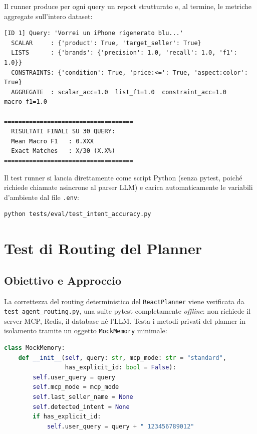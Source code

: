 Il runner produce per ogni query un report strutturato e, al termine,
le metriche aggregate sull'intero dataset:

\begin{lstlisting}[caption={Esempio di output del test runner}]
[ID 1] Query: 'Vorrei un iPhone rigenerato blu...'
  SCALAR     : {'product': True, 'target_seller': True}
  LISTS      : {'brands': {'precision': 1.0, 'recall': 1.0, 'f1': 1.0}}
  CONSTRAINTS: {'condition': True, 'price:<=': True, 'aspect:color': True}
  AGGREGATE  : scalar_acc=1.0  list_f1=1.0  constraint_acc=1.0  macro_f1=1.0

====================================
  RISULTATI FINALI SU 30 QUERY:
  Mean Macro F1   : 0.XXX
  Exact Matches   : X/30 (X.X%)
====================================
\end{lstlisting}

Il test runner si lancia direttamente come script Python (senza pytest,
poiché richiede chiamate asincrone al parser LLM) e carica
automaticamente le variabili d'ambiente dal file \texttt{.env}:

\begin{lstlisting}[language=bash, caption={Comando di esecuzione del test runner NLU}]
python tests/eval/test_intent_accuracy.py
\end{lstlisting}

\section{Test di Routing del Planner}
\label{sec:eval-routing}

\subsection{Obiettivo e Approccio}
\label{subsec:routing-objective}

La correttezza del routing deterministico del \texttt{ReactPlanner}
viene verificata da \texttt{test\_agent\_routing.py}, una suite pytest
completamente \emph{offline}: non richiede il server MCP, Redis, il
database né l'LLM. Testa i metodi privati del planner in isolamento
tramite un oggetto \texttt{MockMemory} minimale:

\begin{lstlisting}[language=Python, caption={Stub MockMemory usato nei test di routing}]
class MockMemory:
    def __init__(self, query: str, mcp_mode: str = "standard",
                 has_explicit_id: bool = False):
        self.user_query = query
        self.mcp_mode = mcp_mode
        self.last_seller_name = None
        self.detected_intent = None
        if has_explicit_id:
            self.user_query = query + " 123456789012"
\end{lstlisting}


